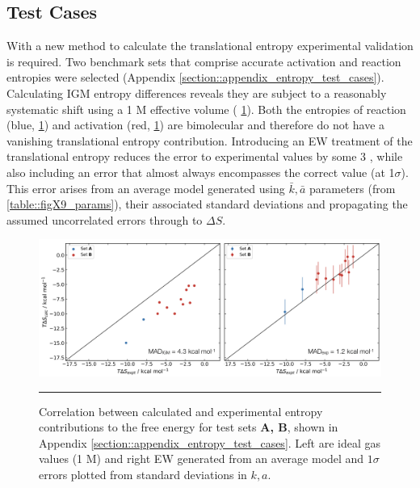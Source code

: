 \documentclass[../main.tex]{subfiles}
\begin{document}
\subsection{Test Cases}

With a new method to calculate the translational entropy experimental validation is required. Two benchmark sets that comprise accurate activation and reaction entropies were selected (Appendix \ref{section::appendix_entropy_test_cases}). Calculating IGM entropy differences reveals they are subject to a reasonably systematic shift using a 1 M effective volume (\figurename{ \ref{fig::entropy_X10}}). Both the entropies of reaction (blue, \figurename{ \ref{fig::entropy_X10}}) and activation (red, \figurename{ \ref{fig::entropy_X10}}) are bimolecular and therefore do not have a vanishing translational entropy contribution. Introducing an EW treatment of the translational entropy reduces the error to experimental values by some 3 \kcal, while also including an error that almost always encompasses the correct value (at 1$\sigma$). This error arises from an average model generated using $\bar{k}, \bar{a}$ parameters (from \tablename{ \ref{table::figX9_params}}), their associated standard deviations and propagating the assumed uncorrelated errors through to $\Delta S$. 

\vspace{0.3cm}
\begin{figure}[h!]
	\includegraphics[width=\textwidth]{4/figs/figX10/figX10}
	\vspace{0.2cm}
	\hrule
	\caption{Correlation between calculated and experimental entropy contributions to the free energy for test sets {\bfseries{A, B}}, shown in Appendix \ref{section::appendix_entropy_test_cases}. Left are ideal gas values (1 M) and right EW generated from an average model and $1\sigma$ errors plotted from standard deviations in $k, a$.} 
	\label{fig::entropy_X10}
\end{figure}
\end{document}
